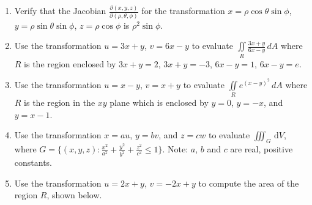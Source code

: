 \documentclass[12pt]{article}
\newif\ifans
\begin{document}
\begin{enumerate}
\ifans{\fbox{$\frac{\partial(x,y)}{\partial(r,\theta)}=\begin{vmatrix}\cos{\theta} & -r\sin{\theta}\\ \sin{\theta} & r\cos{\theta}\end{vmatrix}=r\cos^2{\theta}+r\sin^2{\theta}=r$}} \fi

\item Verify that the Jacobian $\frac{\partial(x,y,z)}{\partial(\rho,\theta,\phi)}$ for the transformation $x=\rho\cos{\theta}\sin{\phi}$, $y=\rho\sin{\theta}\sin{\phi}$, $z=\rho\cos{\phi}$ is $\rho^2\sin{\phi}$.

\ifans{\fbox{$\frac{\partial(x,y,z)}{\partial(\rho,\theta,\phi)}=\begin{vmatrix} \cos{\theta}\sin{\phi} & -\rho\sin{\theta}\cos{\phi} & \rho\cos{\theta}\cos{\phi}\\ \sin{\theta}\sin{\phi} & \rho\cos{\theta}\sin{\phi} & \rho\sin{\theta}\cos{\phi}\\ \cos{\phi} & 0 & -\rho\sin{\phi} \end{vmatrix}=\dots = \rho^2\sin{\phi}$}} \fi

\item Use the transformation $u=3x+y$, $v=6x-y$ to evaluate $\iint \limits_{R} \frac{3x+y}{6x-y} \,dA$ where $R$ is the region enclosed by $3x+y=2$, $3x+y=-3$, $6x-y=1$, $6x-y=e$.

\ifans{\fbox{$-\frac{5}{18}$}} \fi

\item Use the transformation $u=x-y$, $v=x+y$ to evaluate $\iint \limits_{R} e^{(x-y)^2} \,dA$ where $R$ is the region in the $xy$ plane which is enclosed by $y=0$, $y=-x$, and $y=x-1$.

\ifans{\fbox{$\frac{1}{4}(e-1)$}} \fi

\item Use the transformation $x=au$, $y=bv$, and $z=cw$ to evaluate $\displaystyle \iiint_{G}  \,\mathrm{d}V$, where $G = \displaystyle \big\{ (x,y,z) : \frac{x^2}{a^2}+\frac{y^2}{b^2}+\frac{z^2}{c^2}\leq 1 \big\}$.  Note: $a$, $b$ and $c$ are real, positive constants.

\ifans{\fbox{$\frac{4\pi}{3}abc$; This is the volume of the ellipsoid  $\frac{x^2}{a^2}+\frac{y^2}{b^2}+\frac{z^2}{c^2} = 1$}} \fi

\item Use the transformation $u=2x+y$, $v=-2x+y$ to compute the area of the region $R$, shown below.


\end{enumerate}
\end{document}
